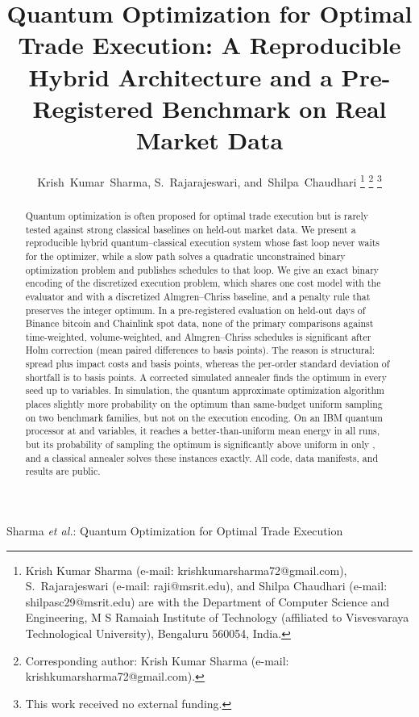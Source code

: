 \documentclass[journal]{IEEEtran}
\begin{document}
\title{Quantum Optimization for Optimal Trade Execution: A Reproducible Hybrid Architecture
and a Pre-Registered Benchmark on Real Market Data}

\author{Krish~Kumar~Sharma, %
        S.~Rajarajeswari, %
        and~Shilpa~Chaudhari%
\thanks{Krish Kumar Sharma (e-mail: krishkumarsharma72@gmail.com), S.~Rajarajeswari
(e-mail: raji@msrit.edu), and Shilpa Chaudhari (e-mail: shilpasc29@msrit.edu) are with the
Department of Computer Science and Engineering, M S Ramaiah Institute of Technology
(affiliated to Visvesvaraya Technological University), Bengaluru 560054, India.}%
\thanks{Corresponding author: Krish Kumar Sharma (e-mail: krishkumarsharma72@gmail.com).}%
\thanks{This work received no external funding.}}%

%
{Sharma \MakeLowercase{\textit{et al.}}: Quantum Optimization for Optimal Trade Execution}

\maketitle

\begin{abstract}
Quantum optimization is often proposed for optimal trade execution but is rarely tested
against strong classical baselines on held-out market data. We present a reproducible hybrid
quantum--classical execution system whose fast loop never waits for the optimizer, while a
slow path solves a quadratic unconstrained binary optimization problem and publishes
schedules to that loop. We give an exact binary encoding of the discretized
execution problem, which shares one cost model with the evaluator and with a
discretized Almgren--Chriss baseline, and a penalty rule that preserves the integer optimum.
In a pre-registered evaluation on \NumTestDays{} held-out days of Binance bitcoin and
Chainlink spot data, none of the \NumPrimaryComparisons{} primary comparisons against
time-weighted, volume-weighted, and Almgren--Chriss schedules is significant after Holm
correction (mean paired differences \PrimaryMinMean{} to \PrimaryMaxMean{} basis points). The
reason is structural: spread plus impact costs \BtcSpreadImpact{} and \LinkSpreadImpact{}
basis points, whereas the per-order standard deviation of shortfall is \BtcStdMin{} to
\LinkStdMax{} basis points. A corrected simulated annealer finds the optimum in every
seed up to \SaSliceAllOptimalUpTo{} variables. In simulation, the quantum approximate
optimization algorithm places slightly more probability on the optimum than same-budget
uniform sampling on two benchmark families, but not on the execution encoding. On an IBM
quantum processor at \HwMinN{} and \HwMaxN{} variables, it reaches a better-than-uniform mean
energy in all \HwNumFinalJobs{} runs, but its probability of sampling the optimum is
significantly above uniform in only \HwRunsSuccessSig{}, and a classical annealer solves
these instances exactly. All code, data manifests, and results are public.
\end{abstract}
\end{document}
